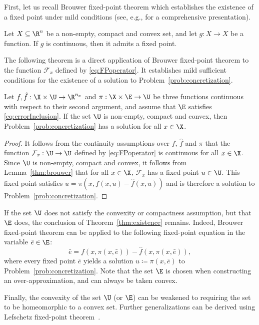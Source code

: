 \documentclass[letterpaper, 10 pt, conference]{ieeeconf}  %
\begin{document}
First, let us recall Brouwer fixed-point theorem \cite{brouwer1911abbildung} which establishes the existence of a fixed point under mild conditions (see, e.g., \cite[Corollary~6.6]{border1985fixed} for a comprehensive presentation).

\begin{lemma}\label{thm:brouwer}
Let $X\subseteq\R^n$ be a non-empty, compact and convex set, and let $g:X\rightarrow X$ be a function. If $g$ is continuous, then it admits a fixed point.
\end{lemma}

The following theorem is a direct application of Brouwer fixed-point theorem to the function $\mathcal{F}_x$ defined by \eqref{eq:FPoperator}. It establishes mild sufficient conditions for the existence of a solution to Problem~\ref{prob:concretization}.

\begin{theorem}\label{thm:existence}
Let $f,\hat{f}:\X\times\U\rightarrow\R^{n_x}$ and $\pi:\X\times\E\rightarrow\U$ be three functions continuous with respect to their second argument, and assume that $\E$ satisfies \eqref{eq:errorInclusion}. If the set $\U$ is non-empty, compact and convex, then Problem~\ref{prob:concretization} has a solution for all $x\in\X$.
\end{theorem}
\begin{proof}
It follows from the continuity assumptions over $f$, $\hat{f}$ and $\pi$ that the function $\mathcal{F}_x:\U\rightarrow\U$ defined by \eqref{eq:FPoperator} is continuous for all $x\in\X$. Since $\U$ is non-empty, compact and convex, it follows from Lemma~\ref{thm:brouwer} that for all $x\in\X$, $\mathcal{F}_x$ has a fixed point $u\in\U$. This fixed point satisfies $u=\pi(x,f(x,u)-\hat{f}(x,u))$ and is therefore a solution to Problem~\ref{prob:concretization}.
\end{proof}

\begin{remark}\label{rem:existence}
If the set $\U$ does not satisfy the convexity or compactness assumption, but that $\E$ does, the conclusion of Theorem~\ref{thm:existence} remains. Indeed, Brouwer fixed-point theorem can be applied to the following fixed-point equation in the variable $\bar{e}\in \E$:
$$
\bar{e}=f(x,\pi(x,\bar{e}))-\hat{f}(x,\pi(x,\bar{e})),
$$
where every fixed point $\bar{e}$ yields a solution $u\coloneqq\pi(x,\bar{e})$ to Problem~\ref{prob:concretization}. Note that the set $\E$ is chosen when constructing an over-approximation, and can always be taken convex.

Finally, the convexity of the set $\U$ (or $\E$) can be weakened to requiring the set to be homeomorphic to a convex set. Further generalizations can be derived using Lefschetz fixed-point theorem~\cite{lefschetz1926intersections}.
\end{remark}
\end{document}
